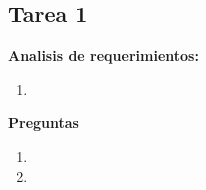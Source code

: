 \documentclass{report}
\begin{document}
	
	
	
	\begin{center}
		\section*{\LARGE{Tarea 1}}
	\end{center}

        \LARGE{\textbf{Analisis de requerimientos:}}\\
        \normalsize
        \begin{enumerate}
            \item 
        \end{enumerate}

    \begin{center}
        \LARGE{\textbf{Preguntas}}\\
    \end{center}
    \normalsize
    \begin{enumerate}%
        \item 
        \item 
    \end{enumerate}
    \newpage
    
\printbibliography
  
\end{document}
